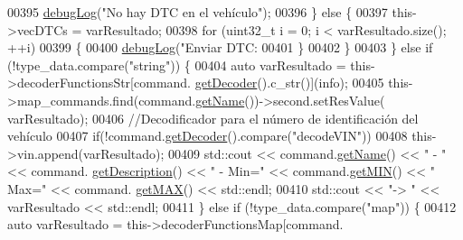 \begin{DoxyCode}
{{{{{{{{{{00395                                         \hyperlink{debug_8hpp_a55f41cf7b0585224496de3d7adbc101c}{debugLog}(\textcolor{stringliteral}{"No hay DTC en el vehículo"});
00396                                     \} \textcolor{keywordflow}{else} \{
00397                                         this->vecDTCs = varResultado;
00398                                         \textcolor{keywordflow}{for} (uint32\_t i = 0; i < varResultado.size(); ++i)
00399                                         \{
00400                                             \hyperlink{debug_8hpp_a55f41cf7b0585224496de3d7adbc101c}{debugLog}(\textcolor{stringliteral}{"Enviar DTC: %
00401                                         \}
00402                                     \}
00403                                 \} \textcolor{keywordflow}{else} \textcolor{keywordflow}{if} (!type\_data.compare(\textcolor{stringliteral}{"string"})) \{
00404                                     \textcolor{keyword}{auto} varResultado = this->decoderFunctionsStr[command.
      \hyperlink{classCommands_a8b4c2a655d8dd3de334338d6684d469c}{getDecoder}().c\_str()](info);
00405                                     this->map\_commands.find(command.\hyperlink{classCommands_adf3d8a96310b1f4e57a6ecf0f2f153ea}{getName}())->second.setResValue(
      varResultado);
00406                                     \textcolor{comment}{//Decodificador para el número de identificación del vehículo}
00407                                     \textcolor{keywordflow}{if}(!command.\hyperlink{classCommands_a8b4c2a655d8dd3de334338d6684d469c}{getDecoder}().compare(\textcolor{stringliteral}{"decodeVIN"}))
00408                                         this->vin.append(varResultado);
00409                                     std::cout << command.\hyperlink{classCommands_adf3d8a96310b1f4e57a6ecf0f2f153ea}{getName}() << \textcolor{stringliteral}{" - "} << command.
      \hyperlink{classCommands_ad82fe7dfcf1908423bdb59d048020e26}{getDescription}() << \textcolor{stringliteral}{" - Min="} << command.\hyperlink{classCommands_af0a1e2ea65b5a57997c721a8d77a1013}{getMIN}() << \textcolor{stringliteral}{" Max="} << command.
      \hyperlink{classCommands_afbad1051313d0cdecba276384cb7fc6b}{getMAX}() << std::endl;
00410                                     std::cout << \textcolor{stringliteral}{"-> "} << varResultado << std::endl;
00411                                 \} \textcolor{keywordflow}{else} \textcolor{keywordflow}{if} (!type\_data.compare(\textcolor{stringliteral}{"map"})) \{
00412                                     \textcolor{keyword}{auto} varResultado = this->decoderFunctionsMap[command.
}}}}}}}}}}}
\end{DoxyCode}
